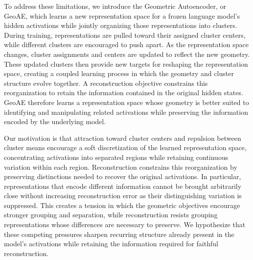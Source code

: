 \documentclass[11pt]{article}
\begin{document}



To address these limitations, we introduce the Geometric Autoencoder, or GeoAE, which learns a new representation space for a frozen language model's hidden activations while jointly organizing those representations into clusters. During training, representations are pulled toward their assigned cluster centers, while different clusters are encouraged to push apart. As the representation space changes, cluster assignments and centers are updated to reflect the new geometry. These updated clusters then provide new targets for reshaping the representation space, creating a coupled learning process in which the geometry and cluster structure evolve together. A reconstruction objective constrains this reorganization to retain the information contained in the original hidden states. GeoAE therefore learns a representation space whose geometry is better suited to identifying and manipulating related activations while preserving the information encoded by the underlying model. 

Our motivation is that attraction toward cluster centers and repulsion between cluster means encourage a soft discretization of the learned representation space, concentrating activations into separated regions while retaining continuous variation within each region. Reconstruction constrains this reorganization by preserving distinctions needed to recover the original activations. In particular, representations that encode different information cannot be brought arbitrarily close without increasing reconstruction error as their distinguishing variation is suppressed. This creates a tension in which the geometric objectives encourage stronger grouping and separation, while reconstruction resists grouping representations whose differences are necessary to preserve. 
We hypothesize that these competing pressures sharpen recurring structure already present in the model's activations while retaining the information required for faithful reconstruction.
\end{document}
